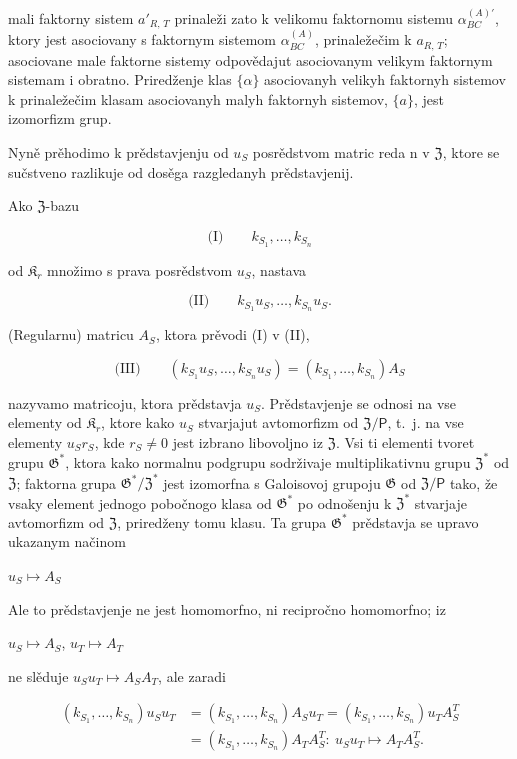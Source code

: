 \documentclass[11pt]{article}
\begin{document}
mali faktorny sistem \(a'_{R,\,T}\) prinaleži zato k velikomu faktornomu sistemu \(\alpha^{(A)\prime}_{BC}\), ktory jest asociovany s faktornym sistemom \(\alpha^{(A)}_{BC}\), prinaležečim k \(a_{R,\,T}\); asociovane male faktorne sistemy odpovědajut asociovanym velikym faktornym sistemam i obratno. Priredženje klas \(\{\alpha\}\) asociovanyh velikyh faktornyh sistemov k prinaležečim klasam asociovanyh malyh faktornyh sistemov, \(\{a\}\), jest izomorfizm grup.

Nyně prěhodimo k prědstavjenju od \(u_S\) posrědstvom matric reda n v \(\mathfrak{Z}\), ktore se sučstveno razlikuje od dosěga razgledanyh prědstavjenij.

Ako \(\mathfrak Z\)-bazu

\[
\text{(I)}\qquad k_{S_1}, \ldots, k_{S_n}
\]

od \(\mathfrak K_r\) množimo s prava posrědstvom \(u_S\), nastava

\[
\text{(II)}\qquad k_{S_1}u_S, \ldots, k_{S_n}u_S.
\]

(Regularnu) matricu \(A_S\), ktora prěvodi (I) v (II),

\[
\text{(III)}\qquad (k_{S_1}u_S, \ldots, k_{S_n}u_S) = (k_{S_1}, \ldots, k_{S_n})A_S
\]

nazyvamo matricoju, ktora prědstavja \(u_S\). Prědstavjenje se odnosi na vse elementy od \(\mathfrak K_{r}\), ktore kako \(u_S\) stvarjajut avtomorfizm od \(\mathfrak Z/\mathsf{P}\), t.~j. na vse elementy \(u_Sr_S\), kde \(r_S \neq 0\) jest izbrano libovoljno iz \(\mathfrak Z\). Vsi ti elementi tvoret grupu \(\mathfrak G^*\), ktora kako normalnu podgrupu sodrživaje multiplikativnu grupu \(\mathfrak Z^*\) od \(\mathfrak Z\); faktorna grupa \(\mathfrak G^*/\mathfrak Z^*\) jest izomorfna s Galoisovoj grupoju \(\mathfrak G\) od \(\mathfrak Z/\mathsf{P}\) tako, že vsaky element jednogo pobočnogo klasa od \(\mathfrak G^*\) po odnošenju k \(\mathfrak Z^*\) stvarjaje avtomorfizm od \(\mathfrak Z\), priredženy tomu klasu. Ta grupa \(\mathfrak G^*\) prědstavja se upravo ukazanym načinom

\(u_S \mapsto A_S\)

Ale to prědstavjenje ne jest homomorfno, ni recipročno homomorfno; iz

\(u_S \mapsto A_S\), \(u_T \mapsto A_T\)

ne slěduje \(u_Su_T \mapsto A_SA_T\), ale zaradi

\[
\begin{aligned}
(k_{S_1}, \ldots, k_{S_n})u_Su_T
&=(k_{S_1}, \ldots, k_{S_n})A_Su_T
=(k_{S_1}, \ldots, k_{S_n})u_TA_S^T\\
&=(k_{S_1}, \ldots, k_{S_n})A_TA_S^T:\ u_Su_T\mapsto A_TA_S^T.
\end{aligned}
\]
\end{document}
